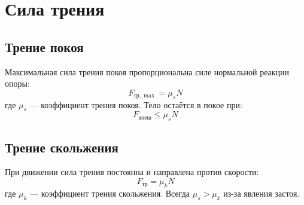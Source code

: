 \documentclass[12pt]{article}
\begin{document}
\section*{Сила трения}

\subsection*{Трение покоя}
Максимальная сила трения покоя пропорциональна силе нормальной реакции опоры:
\[
F_{\mathrm{тр},\max} = \mu_s N
\]
где $\mu_s$ — коэффициент трения покоя. Тело остаётся в покое при:
\[
F_{\mathrm{внеш}} \leq \mu_s N
\]

\subsection*{Трение скольжения}
При движении сила трения постоянна и направлена против скорости:
\[
F_{\mathrm{тр}} = \mu_k N
\]
где $\mu_k$ — коэффициент трения скольжения. Всегда $\mu_s > \mu_k$ из-за явления застоя.
\end{document}
